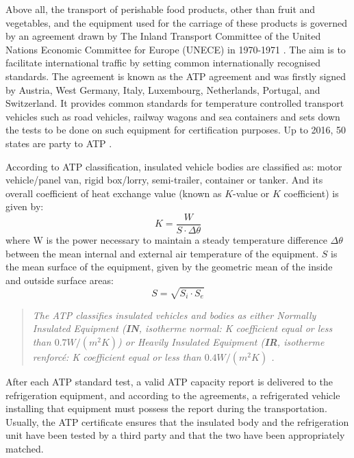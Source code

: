 Above all, the transport of perishable food products, other than fruit and vegetables, and the equipment used for the carriage of these products is governed by an agreement drawn by The Inland Transport Committee of the United Nations Economic Committee for Europe (UNECE) in 1970-1971 \citep{Geneva1970}. The aim is to facilitate international traffic by setting common internationally recognised standards. The agreement is known as the ATP agreement and was firstly signed by Austria, West Germany, Italy, Luxembourg, Netherlands, Portugal, and Switzerland.  It provides common standards for temperature controlled transport vehicles such as road vehicles, railway wagons and sea containers and sets down the tests to be done on such equipment for certification purposes. Up to 2016, 50 states are party to ATP \citep{ATP_wiki}.


According to ATP classification, insulated vehicle bodies are classified as: motor vehicle/panel van, rigid box/lorry, semi-trailer, container or tanker. And its overall coefficient of heat exchange value (known as $K$-value or $K$ coefficient) is given by:
\begin{equation}
K = \frac{W}{S\cdot \Delta \theta}
\end{equation}
where W is  the  power  necessary  to  maintain  a  steady  temperature  difference $\Delta \theta$ between  the  mean internal and external air temperature of the equipment. $S$ is the mean surface of the equipment, given by the geometric mean of the inside and outside surface areas:
\begin{equation}
S = \sqrt{S_i \cdot S_e}
\end{equation}

\begin{quote}
	\textit{The ATP classifies insulated vehicles and bodies as either Normally Insulated Equipment (\textbf{IN}, isotherme normal: K coefficient equal or less than $ 0.7 W/(m^2 K) $) or Heavily Insulated Equipment (\textbf{IR}, isotherme renforcé: K coefficient equal or less than $ 0.4 W/(m^2 K )$ \citep{Tassou2009}.}
\end{quote}

After each ATP standard test, a valid ATP capacity report is delivered to the refrigeration equipment, and according to the agreements, a refrigerated vehicle installing that equipment must possess the report during the transportation. Usually, the ATP certificate ensures that the insulated body and the refrigeration unit have been tested by a third party and that the two have been appropriately matched.

